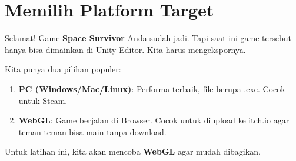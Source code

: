 
\section{Memilih Platform Target}

Selamat! Game \textbf{Space Survivor} Anda sudah jadi. Tapi saat ini game tersebut hanya bisa dimainkan di Unity Editor. Kita harus mengekspornya.

Kita punya dua pilihan populer:
\begin{enumerate}
    \item \textbf{PC (Windows/Mac/Linux)}: Performa terbaik, file berupa .exe. Cocok untuk Steam.
    \item \textbf{WebGL}: Game berjalan di Browser. Cocok untuk diupload ke itch.io agar teman-teman bisa main tanpa download.
\end{enumerate}

Untuk latihan ini, kita akan mencoba \textbf{WebGL} agar mudah dibagikan.
